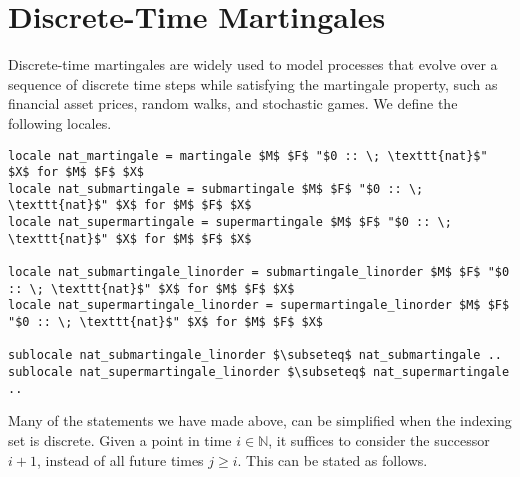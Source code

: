 \section{Discrete-Time Martingales}

Discrete-time martingales are widely used to model processes that evolve over a sequence of discrete time steps while satisfying the martingale property, such as financial asset prices, random walks, and stochastic games. We define the following locales.

\begin{isadefinition}
{\small
\begin{lstlisting}[style=isabelle]
locale nat_martingale = martingale $M$ $F$ "$0 :: \; \texttt{nat}$" $X$ for $M$ $F$ $X$
locale nat_submartingale = submartingale $M$ $F$ "$0 :: \; \texttt{nat}$" $X$ for $M$ $F$ $X$
locale nat_supermartingale = supermartingale $M$ $F$ "$0 :: \; \texttt{nat}$" $X$ for $M$ $F$ $X$

locale nat_submartingale_linorder = submartingale_linorder $M$ $F$ "$0 :: \; \texttt{nat}$" $X$ for $M$ $F$ $X$
locale nat_supermartingale_linorder = supermartingale_linorder $M$ $F$ "$0 :: \; \texttt{nat}$" $X$ for $M$ $F$ $X$

sublocale nat_submartingale_linorder $\subseteq$ nat_submartingale ..
sublocale nat_supermartingale_linorder $\subseteq$ nat_supermartingale ..
\end{lstlisting}
}
\end{isadefinition}

Many of the statements we have made above, can be simplified when the indexing set is discrete. Given a point in time $i \in \mathbb{N}$, it suffices to consider the successor $i + 1$, instead of all future times $j \ge i$. This can be stated as follows.

